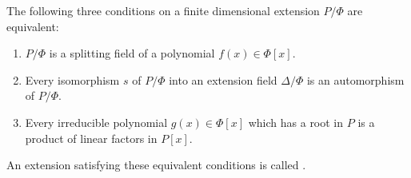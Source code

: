 The following three conditions on a finite dimensional extension $P/\Phi$ are equivalent:
\begin{enumerate}
\item[(1)] $P/\Phi$ is a splitting field of a polynomial $f(x) \in \Phi[x]$.
\item[(2)] Every isomorphism $s$ of $P/\Phi$ into an extension field $\Delta/\Phi$ is an automorphism of $P/\Phi$.
\item[(3)] Every irreducible polynomial $g(x) \in \Phi[x]$ which has a root in $P$ is a product of linear factors in $P[x]$.
\end{enumerate}
An extension satisfying these equivalent conditions is called .
